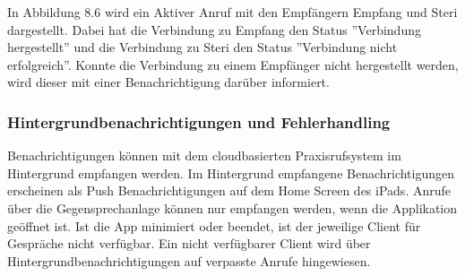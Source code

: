 In Abbildung 8.6 wird ein Aktiver Anruf mit den Empfängern Empfang und Steri dargestellt.
Dabei hat die Verbindung zu Empfang den Status ''Verbindung hergestellt'' und die Verbindung zu Steri den Status ''Verbindung nicht erfolgreich''.
Konnte die Verbindung zu einem Empfänger nicht hergestellt werden, wird dieser mit einer Benachrichtigung darüber informiert.


\clearpage

\subsubsection*{Hintergrundbenachrichtigungen und Fehlerhandling}

Benachrichtigungen können mit dem cloudbasierten Praxisrufsystem im Hintergrund empfangen werden.
Im Hintergrund empfangene Benachrichtigungen erscheinen als Push Benachrichtigungen auf dem Home Screen des iPads.
Anrufe über die Gegensprechanlage können nur empfangen werden, wenn die Applikation geöffnet ist.
Ist die App minimiert oder beendet, ist der jeweilige Client für Gespräche nicht verfügbar.
Ein nicht verfügbarer Client wird über Hintergrundbenachrichtigungen auf verpasste Anrufe hingewiesen.

